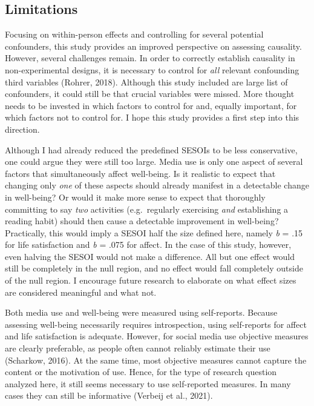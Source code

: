 \documentclass[
  man,mask,floatsintext]{apa7}
\begin{document}
\hypertarget{limitations}{%
\subsection{Limitations}\label{limitations}}

Focusing on within-person effects and controlling for several potential confounders, this study provides an improved perspective on assessing causality.
However, several challenges remain.
In order to correctly establish causality in non-experimental designs, it is necessary to control for \emph{all} relevant confounding third variables (Rohrer, 2018).
Although this study included are large list of confounders, it could still be that crucial variables were missed.
More thought needs to be invested in which factors to control for and, equally important, for which factors not to control for.
I hope this study provides a first step into this direction.

Although I had already reduced the predefined SESOIs to be less conservative, one could argue they were still too large.
Media use is only one aspect of several factors that simultaneously affect well-being.
Is it realistic to expect that changing only \emph{one} of these aspects should already manifest in a detectable change in well-being?
Or would it make more sense to expect that thoroughly committing to say \emph{two} activities (e.g.~regularly exercising \emph{and} establishing a reading habit) should then cause a detectable improvement in well-being?
Practically, this would imply a SESOI half the size defined here, namely \emph{b} = \textbar.15\textbar{} for life satisfaction and \emph{b} = \textbar.075\textbar{} for affect.
In the case of this study, however, even halving the SESOI would not make a difference.
All but one effect would still be completely in the null region, and no effect would fall completely outside of the null region.
I encourage future research to elaborate on what effect sizes are considered meaningful and what not.

Both media use and well-being were measured using self-reports.
Because assessing well-being necessarily requires introspection, using self-reports for affect and life satisfaction is adequate.
However, for social media use objective measures are clearly preferable, as people often cannot reliably estimate their use (Scharkow, 2016).
At the same time, most objective measures cannot capture the content or the motivation of use.
Hence, for the type of research question analyzed here, it still seems necessary to use self-reported measures.
In many cases they can still be informative (Verbeij et al., 2021).
\end{document}
